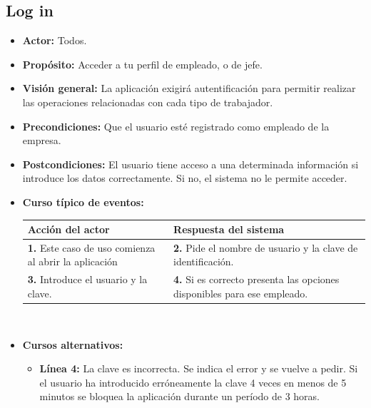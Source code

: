 \documentclass[spanish,a4paper,11pt, twoside]{report}	%
\begin{document}

	\subsection{Log in}		
			\begin{itemize}
			\item \textbf{Actor:} Todos.
			\item \textbf{Propósito:} Acceder a tu perfil de empleado, o de jefe.
			\item \textbf{Visión general:} La aplicación exigirá autentificación para permitir realizar las operaciones relacionadas con cada tipo de trabajador.
			\item \textbf{Precondiciones:} Que el usuario esté registrado como empleado de la empresa.
			\item \textbf{Postcondiciones:} El usuario tiene acceso a una determinada información si introduce los datos correctamente. Si no, el sistema no le permite acceder. 
			\item \textbf{Curso típico de eventos:} 	\\
				\begin{tabular}{|p{6cm}||p{6cm}|}
				\hline
				\textbf{Acción del actor} & \textbf{Respuesta del sistema} \\ \hline \hline
				\textbf{1.} Este caso de uso comienza al abrir la aplicación & \textbf{2.} Pide el nombre de usuario y  la clave de identificación.\\ \hline 
				\textbf{3.} Introduce el usuario y  la clave. & \textbf{4.} Si es correcto presenta las opciones disponibles para ese empleado.\\ \hline
			\end{tabular}
			\\
			\item \textbf{Cursos alternativos:} 
			\begin{itemize}
			\item  \textbf{Línea 4:} La clave es incorrecta. Se indica el error y se vuelve a pedir. Si el usuario ha introducido erróneamente la clave 4 veces en menos de 5 minutos se bloquea la aplicación durante un período de 3 horas.
			\end {itemize}
		\end{itemize}
\end{document}
